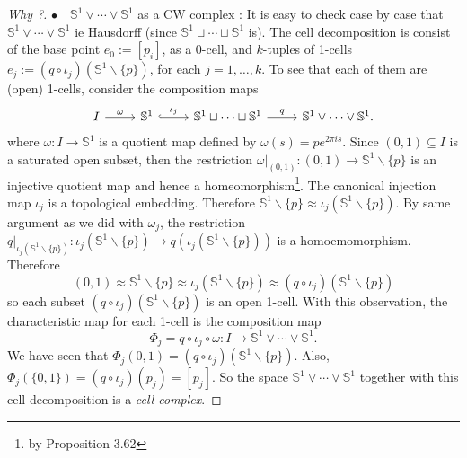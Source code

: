 \documentclass[a4paper]{article}
\theoremstyle{remark}
\newcommand{\s}{\mathbb{S}} %
\newcommand{\subhim}{\subseteq} %
\begin{document}
\begin{proof}[Why ?]
	$\bullet \quad \s^1 \vee \cdots \vee \s^1 $ as a CW complex : It is easy to check case by case that $\s^1 \vee \cdots \vee \s^1$ ie Hausdorff (since $\s^1 \sqcup \cdots \sqcup \s^1$ is). The cell decomposition is consist of the base point $e_0:=[p_i]$, as a 0-cell, and $k$-tuples of 1-cells $e_j:= (q \circ \iota_j)(\s^1 \smallsetminus \{p\})$, for each $j =1,\dots,k$. To see that each of them are (open) 1-cells, consider the composition maps
	\[
	\begin{tikzcd}
	I \arrow[r,"\omega"] &  \s^1  \arrow[r,"\iota_j",hookrightarrow] & \s^1 \sqcup \cdots \sqcup \s^1 \arrow[r,"q"] & \s^1 \vee \cdots \vee \s^1.
	\end{tikzcd}
	\]	
	where $\omega : I \to \s^1$ is a quotient map defined by $\omega(s) = p e^{2\pi i s}$. Since $(0,1) \subhim I$ is a saturated open subset, then the restriction $\omega|_{(0,1)} : (0,1) \to \s^1 \smallsetminus \{p\}$ is an injective quotient map and hence a homeomorphism\footnote[2]{by Proposition 3.62}. The canonical injection map $\iota_j$ is a topological embedding. Therefore $\s^1 \smallsetminus \{p\} \approx \iota_j (\s^1 \smallsetminus \{p\})$. By same argument as we did with $\omega_j$, the restriction $q|_{\iota_j (\s^1 \smallsetminus \{p\})} : \iota_j (\s^1 \smallsetminus \{p\}) \to q(\iota_j (\s^1 \smallsetminus \{p\}))$ is a homoemomorphism. Therefore
	$$
	(0,1) \approx \s^1 \smallsetminus \{p\} \approx \iota_j (\s^1 \smallsetminus \{p\}) \approx (q \circ \iota_j)(\s^1 \smallsetminus \{p\})
	$$   
	so each subset $(q \circ \iota_j) (\s^1 \smallsetminus \{p\})$ is an open 1-cell. With this observation, the characteristic map for each 1-cell is the composition map
	$$
	\Phi_j = q \circ \iota_j \circ \omega : I \to \s^1 \vee \cdots \vee \s^1.
	$$
	We have seen that $\Phi_j (0,1) = (q \circ \iota_j)(\s^1 \smallsetminus \{p\})$. Also, $\Phi_j(\{0,1\}) = (q \circ \iota_j)(p_j)=[p_j]$. So the space $\s^1 \vee \cdots \vee \s^1$ together with this cell decomposition is a \textit{cell complex}. 
	

\end{proof}
\end{document}
